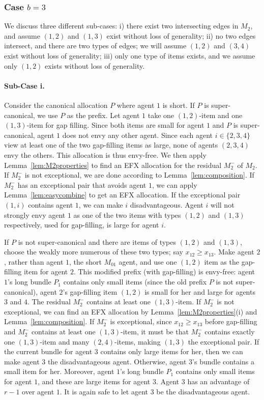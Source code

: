 \documentclass{article}
\theoremstyle{definition}
\begin{document}
\subsubsection{Case $b=3$}
We discuss three different sub-cases: i) there exist two intersecting edges in $M_2$, and assume $(1,2)$ and $(1,3)$ exist without loss of generality; ii) no two edges intersect, and there are two types of edges; we will assume $(1,2)$ and $(3,4)$ exist without loss of generality; iii) only one type of items exists, and we assume only $(1,2)$ exists without loss of generality.

\paragraph{Sub-Case i.}
Consider the canonical allocation $P$ where agent $1$ is short.
If $P$ is super-canonical, we use $P$ as the prefix.
Let agent $1$ take one $(1,2)$-item and one $(1,3)$-item for gap filling.
Since both items are small for agent $1$ and $P$ is super-canonical, agent $1$ does not envy any other agent.
Since each agent $i\in\{2,3,4\}$ view at least one of the two gap-filling items as large, none of agents $(2,3,4)$ envy the others.
This allocation is thus envy-free.
We then apply Lemma~\ref{lem:M2properties} to find an EFX allocation for the residual $M_2^-$ of $M_2$.
If $M_2^-$ is not exceptional, we are done according to Lemma~\ref{lem:composition}.
If $M_2^-$ has an exceptional pair that avoids agent $1$, we can apply Lemma~\ref{lem:easycombine} to get an EFX allocation.
If the exceptional pair $(1,i)$ contains agent $1$, we can make $i$ disadvantageous.
Agent $i$ will not strongly envy agent $1$ as one of the two items with types $(1,2)$ and $(1,3)$ respectively, used for gap-filling, is large for agent $i$.

If $P$ is not super-canonical and there are items of types
$(1,2)$ and $(1,3)$, choose the weakly more numerous of these two types; say $x_{12}\ge x_{13}$.  
Make agent $2$, rather than agent $1$, the short $M_{01}$ agent, and use one $(1,2)$ item as the gap-filling item for agent $2$.  
This modified prefix (with gap-filling) is envy-free: agent $1$'s long bundle $P_1$ contains only small items (since the old prefix $P$ is not super-canonical), agent $2$'s gap-filling item $(1,2)$ is small for her and large for agents $3$ and $4$.
The residual $M_2^-$ contains at least one $(1,3)$-item.
If $M_2^-$ is not exceptional, we can find an EFX allocation by Lemma~\ref{lem:M2properties}(i) and Lemma~\ref{lem:composition}.
If $M_2^-$ is exceptional, since $x_{12}\ge x_{13}$ before gap-filling and $M_2^-$ contains at least one $(1,3)$-item, it must be that $M_2^-$ contains exactly one $(1,3)$-item and many $(2,4)$-items, making $(1,3)$ the exceptional pair.
If the current bundle for agent $3$ contains only large items for her, then we can make agent $3$ the disadvantageous agent.
Otherwise, agent $3$'s bundle contains a small item for her.
Moreover, agent $1$'s long bundle $P_1$ contains only small items for agent $1$, and these are large items for agent $3$. 
Agent $3$ has an advantage of $r-1$ over agent $1$.
It is again safe to let agent $3$ be the disadvantageous agent.
\end{document}
